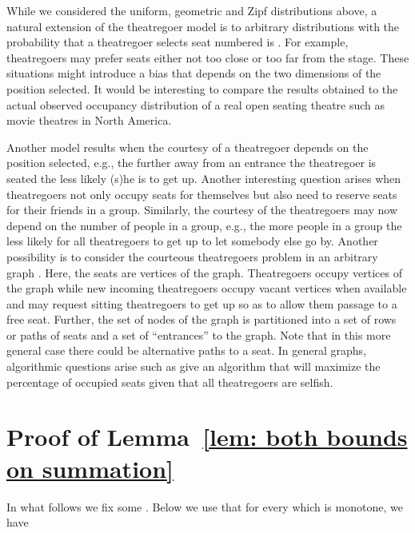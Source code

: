 \documentclass[11pt]{llncs}
\begin{document}
While we considered the uniform, geometric and Zipf distributions above,
a natural extension of the theatregoer model is to arbitrary distributions
with the probability that a theatregoer selects seat numbered
 is .
For example, theatregoers may prefer seats either not too close or too far from the stage.
These situations might introduce a bias 
that depends on the two dimensions of the position selected.
It would be interesting to compare the results obtained to
the actual observed occupancy distribution of a real open seating theatre
such as movie theatres in North America.  


Another model results when the courtesy of a theatregoer
depends on the position selected, e.g., the further away from
an entrance the theatregoer is seated the less likely (s)he is
to get up.
Another interesting question arises when theatregoers
not only occupy seats for themselves but also 
need to reserve seats for their friends in a group.
Similarly, the courtesy of the theatregoers may now
depend on the number of people in a group, e.g.,
the more people in a group the less likely for all
theatregoers to get up to let somebody else go by. 
Another possibility is to
consider the courteous theatregoers problem in an
arbitrary graph . Here, the seats
are vertices of the graph. Theatregoers
occupy vertices of the graph while new incoming theatregoers
occupy vacant vertices when available and may request 
sitting theatregoers to get up so as to allow them passage
to a free seat. Further, the set of nodes of the graph
is partitioned into a set of rows or paths of seats and a set
of ``entrances'' to the graph.
Note that in this more general case there could be
alternative paths to a seat. 
In general graphs, algorithmic questions arise such as 
give an algorithm that will maximize the 
percentage of occupied seats given that all theatregoers
are selfish.















\appendix
\section{Proof of Lemma~\ref{lem: both bounds on summation} }




In what follows we fix some .
Below we use that for every  which is monotone, we have  
\end{document}
